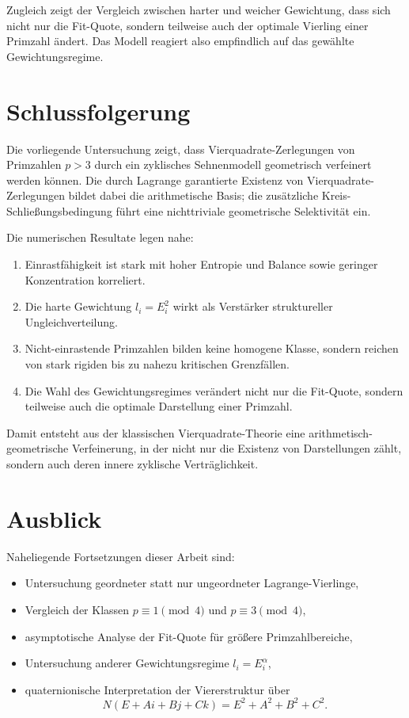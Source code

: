 \documentclass[11pt,a4paper]{article}
\theoremstyle{remark}
\begin{document}
	Zugleich zeigt der Vergleich zwischen harter und weicher Gewichtung, dass sich nicht nur die Fit-Quote, sondern teilweise auch der optimale Vierling einer Primzahl ändert. Das Modell reagiert also empfindlich auf das gewählte Gewichtungsregime.
	
	\section{Schlussfolgerung}
	
	Die vorliegende Untersuchung zeigt, dass Vierquadrate-Zerlegungen von Primzahlen \(p>3\) durch ein zyklisches Sehnenmodell geometrisch verfeinert werden können. Die durch Lagrange garantierte Existenz von Vierquadrate-Zerlegungen bildet dabei die arithmetische Basis; die zusätzliche Kreis-Schließungsbedingung führt eine nichttriviale geometrische Selektivität ein.
	
	Die numerischen Resultate legen nahe:
	
	\begin{enumerate}[label=\arabic*)]
		\item Einrastfähigkeit ist stark mit hoher Entropie und Balance sowie geringer Konzentration korreliert.
		\item Die harte Gewichtung \(l_i = E_i^2\) wirkt als Verstärker struktureller Ungleichverteilung.
		\item Nicht-einrastende Primzahlen bilden keine homogene Klasse, sondern reichen von stark rigiden bis zu nahezu kritischen Grenzfällen.
		\item Die Wahl des Gewichtungsregimes verändert nicht nur die Fit-Quote, sondern teilweise auch die optimale Darstellung einer Primzahl.
	\end{enumerate}
	
	Damit entsteht aus der klassischen Vierquadrate-Theorie eine arithmetisch-geometrische Verfeinerung, in der nicht nur die Existenz von Darstellungen zählt, sondern auch deren innere zyklische Verträglichkeit.
	
	\section*{Ausblick}
	
	Naheliegende Fortsetzungen dieser Arbeit sind:
	
	\begin{itemize}
		\item Untersuchung geordneter statt nur ungeordneter Lagrange-Vierlinge,
		\item Vergleich der Klassen \(p\equiv 1 \pmod 4\) und \(p\equiv 3 \pmod 4\),
		\item asymptotische Analyse der Fit-Quote für größere Primzahlbereiche,
		\item Untersuchung anderer Gewichtungsregime \(l_i = E_i^\alpha\),
		\item quaternionische Interpretation der Viererstruktur über
		\[
		N(E+Ai+Bj+Ck)=E^2+A^2+B^2+C^2.
		\]
	\end{itemize}
	
\end{document}
